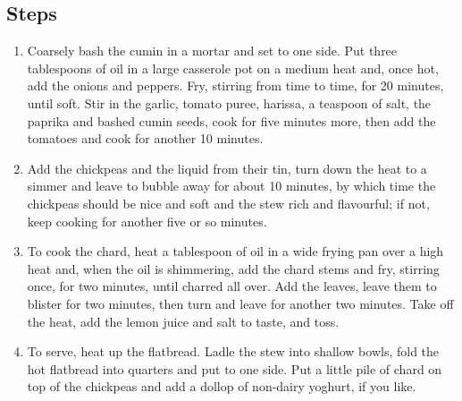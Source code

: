 \documentclass{book}
\begin{document}
\subsection*{Steps}
\begin{enumerate}
\item Coarsely bash the cumin in a mortar and set to one side. Put three tablespoons of oil in a large casserole pot on a medium heat and, once hot, add the onions and peppers. Fry, stirring from time to time, for 20 minutes, until soft. Stir in the garlic, tomato puree, harissa, a teaspoon of salt, the paprika and bashed cumin seeds, cook for five minutes more, then add the tomatoes and cook for another 10 minutes. 
\item Add the chickpeas and the liquid from their tin, turn down the heat to a simmer and leave to bubble away for about 10 minutes, by which time the chickpeas should be nice and soft and the stew rich and flavourful; if not, keep cooking for another five or so minutes.
\item To cook the chard, heat a tablespoon of oil in a wide frying pan over a high heat and, when the oil is shimmering, add the chard stems and fry, stirring once, for two minutes, until charred all over. Add the leaves, leave them to blister for two minutes, then turn and leave for another two minutes. Take off the heat, add the lemon juice and salt to taste, and toss.
\item To serve, heat up the flatbread. Ladle the stew into shallow bowls, fold the hot flatbread into quarters and put to one side. Put a little pile of chard on top of the chickpeas and add a dollop of non-dairy yoghurt, if you like.
\end{enumerate}
\newpage
\end{document}
